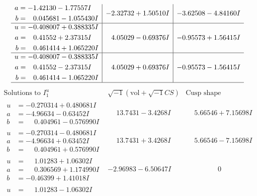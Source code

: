 \documentclass[1p]{elsarticle_modified}
\theoremstyle{definition}
\newcommand{\I}{\sqrt{-1}}
\begin{document}
$$\begin{array}{c|c|c}
\begin{aligned}
a &= -1.42130 - 1.77557 I \\
b &= \phantom{-}0.045681 - 1.055430 I\end{aligned}
 & -2.32732 + 1.50510 I & -3.62508 - 4.84160 I \\ \hline\begin{aligned}
u &= -0.408007 + 0.388335 I \\
a &= \phantom{-}0.41552 + 2.37315 I \\
b &= \phantom{-}0.461414 + 1.065220 I\end{aligned}
 & \phantom{-}4.05029 - 0.69376 I & -0.95573 + 1.56415 I \\ \hline\begin{aligned}
u &= -0.408007 - 0.388335 I \\
a &= \phantom{-}0.41552 - 2.37315 I \\
b &= \phantom{-}0.461414 - 1.065220 I\end{aligned}
 & \phantom{-}4.05029 + 0.69376 I & -0.95573 - 1.56415 I\\
 \hline 
 \end{array}$$\newpage$$\begin{array}{c|c|c}  
\text{Solutions to }I^u_{1}& \I (\text{vol} + \sqrt{-1}CS) & \text{Cusp shape}\\
 \hline 
\begin{aligned}
u &= -0.270314 + 0.480681 I \\
a &= -4.96634 - 0.63452 I \\
b &= \phantom{-}0.404961 - 0.576990 I\end{aligned}
 & \phantom{-}13.7431 - 3.4268 I & \phantom{-}5.66546 + 7.15698 I \\ \hline\begin{aligned}
u &= -0.270314 - 0.480681 I \\
a &= -4.96634 + 0.63452 I \\
b &= \phantom{-}0.404961 + 0.576990 I\end{aligned}
 & \phantom{-}13.7431 + 3.4268 I & \phantom{-}5.66546 - 7.15698 I \\ \hline\begin{aligned}
u &= \phantom{-}1.01283 + 1.06302 I \\
a &= \phantom{-}0.306569 + 1.174990 I \\
b &= -0.46399 + 1.41018 I\end{aligned}
 & -2.96983 - 6.50647 I & \phantom{-0.000000 } 0 \\ \hline\begin{aligned}
u &= \phantom{-}1.01283 - 1.06302 I \\

\end{aligned}
\end{array}$$
\end{document}
